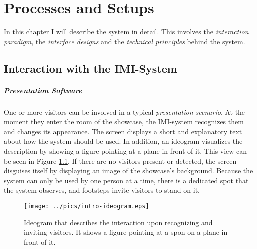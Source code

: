 \chapter{Processes and Setups}
\label{installation}

In this chapter I will describe the system in detail. This involves the \textit{interaction paradigm}, the \textit{interface designs} and the \textit{technical principles} behind the system. 


\section{Interaction with the \ac{IMI}-System}
\label{installation_interaction}

\paragraph{Presentation Software} One or more visitors can be involved in a typical \textit{presentation scenario}. At the moment they enter the room of the showcase, the \ac{IMI}-system recognizes them and changes its appearance. The screen displays a short and explanatory text about how the system should be used. In addition, an ideogram visualizes the description by showing a figure pointing at a plane in front of it. This view can be seen in Figure \ref{fig:intro}. If there are no visitors present or detected, the screen disguises itself by displaying an image of the showcase's background. Because the system can only be used by one person at a time, there is a dedicated spot that the system observes, and footsteps invite visitors to stand on it. 
\begin{figure}[H]%
\texttt{[image: ../pics/intro-ideogram.eps]}%
\caption{Ideogram that describes the interaction upon recognizing and inviting visitors. It shows a figure pointing at a spon on a plane in front of it.}%
\label{fig:intro}%
\end{figure}

